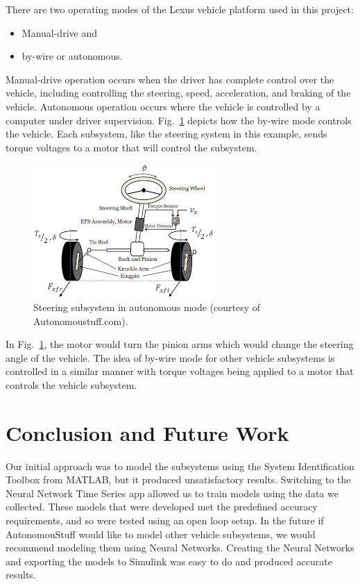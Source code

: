 \documentclass[conference]{IEEEtran}
\begin{document}
There are two operating modes of the Lexus vehicle platform used in this project: %
%
\begin{itemize}
  \item Manual-drive and
  \item by-wire or autonomous.
\end{itemize}
%
Manual-drive operation occurs when the driver has complete control over the vehicle, including controlling the steering, speed, acceleration, and braking of the vehicle. Autonomous operation occurs where the vehicle is controlled by a computer under driver supervision.
%
Fig.~\ref{fig:steerOverview} depicts how the by-wire mode controls the vehicle. Each
subsystem, like the steering system in this example, sends torque voltages to a
motor that will control the subsystem. %
%
\begin{figure}[htbp]
  \centering
  \includegraphics[scale=0.8]{figs/img/autonomousVehiclesSteering}
  \caption{Steering subsystem in autonomous mode (courtesy of Autonomoustuff.com).}
  \label{fig:steerOverview}
\end{figure}
%
In Fig.~\ref{fig:steerOverview}, the motor would
turn the pinion arms which would change the steering angle of the vehicle. The idea of by-wire mode for other vehicle subsystems is controlled in a similar manner with torque voltages being applied to a motor that controls the vehicle subsystem.




\vspace*{12pt}




\section{Conclusion and Future Work}
\label{sec:conclustionAndFutureWork}
Our initial approach was to model the subsystems using the System Identification Toolbox from MATLAB, but it produced unsatisfactory results. Switching to the Neural Network Time Series app allowed us to train models using the data we collected. These models that were developed met the predefined accuracy requirements, and so were tested using an open loop setup. In the future if AutonomouStuff would like to model other vehicle subsystems, we would recommend modeling them using Neural Networks. Creating the Neural Networks and exporting the models to Simulink was easy to do and produced accurate results.
\end{document}
